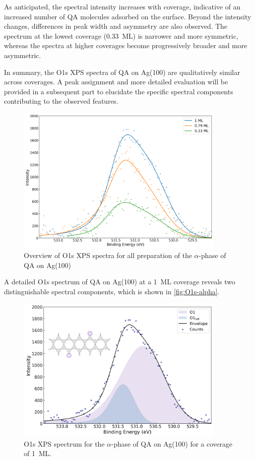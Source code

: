 As anticipated, the spectral intensity increases with coverage, indicative of an increased number of \ac{QA} molecules adsorbed on the surface. Beyond the intensity changes, differences in peak width and asymmetry are also observed. The spectrum at the lowest coverage (0.33~\si{ML}) is narrower and more symmetric, whereas the spectra at higher coverages become progressively broader and more asymmetric.

In summary, the O1s \ac{XPS} spectra of \ac{QA} on Ag(100) are qualitatively similar across coverages. A peak assignment and more detailed evaluation will be provided in a subsequent part to elucidate the specific spectral components contributing to the observed features.

\begin{figure}[H]
	\centering
	\includegraphics[width=0.9\textwidth]{images/O1s-alpha-comparison.png}
	\caption{Overview of O1s \ac{XPS} spectra for all preparation of the $\alpha$-phase of \ac{QA} on Ag(100)}
	\label{fig:O1s-comparison}
\end{figure}

A detailed O1s spectrum of \ac{QA} on Ag(100) at a 1~\ac{ML} coverage reveals two distinguishable spectral components, which is shown in \autoref{fig:O1s-alpha}.

\begin{figure}[H]
	\centering
	\includegraphics[width=0.9\textwidth]{images/O1s-alpha-P1.png}
	\caption{O1s \ac{XPS} spectrum for the $\alpha$-phase of \ac{QA} on Ag(100) for a coverage of 1~\ac{ML}.}
	\label{fig:O1s-alpha}
\end{figure}

